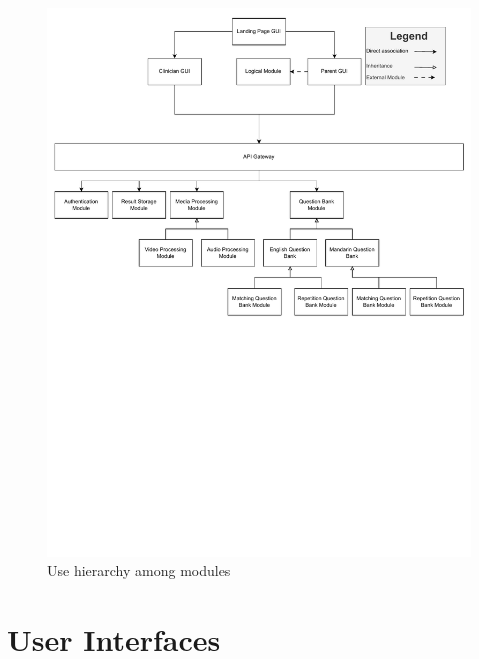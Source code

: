 \documentclass[12pt, titlepage]{article}
\begin{document}
\begin{figure}[H]
  \centering
  \includegraphics[scale=0.8]{images/ModuleHierachy.pdf}
  \caption{Use hierarchy among modules}
  \label{FigUH}
\end{figure}


\newpage

\section{User Interfaces}
\end{document}
